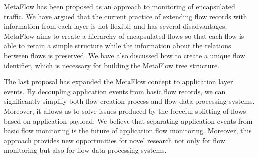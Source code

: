 MetaFlow has been proposed as an approach to monitoring of encapsulated traffic. We have argued that the current practice of extending flow records with information from each layer is not flexible and has several disadvantages. MetaFlow aims to create a hierarchy of encapsulated flows so that each flow is able to retain a simple structure while the information about the relations between flows is preserved. We have also discussed how to create a unique flow identifier, which is necessary for building the MetaFlow tree structure.

The last proposal has expanded the MetaFlow concept to application layer events. By decoupling application events from basic flow records, we can significantly simplify both flow creation process and flow data processing systems. Moreover, it allows us to solve issues produced by the forceful splitting of flows based on application payload. We believe that separating application events from basic flow monitoring is the future of application flow monitoring. Moreover, this approach provides new opportunities for novel research not only for flow monitoring but also for flow data processing systems.